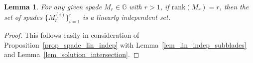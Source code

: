 \documentclass{birkjour}
\newtheorem{lem}[thm]{Lemma}
\theoremstyle{definition}
\theoremstyle{remark}
\numberwithin{equation}{section}
\newcommand{\G}{\mathbb{G}}
\newcommand{\rank}{\mbox{rank}}
\begin{document}
\begin{lem}
For any given spade $M_r\in\G$ with $r>1$, if $\rank(M_r)=r$, then
the set of spades $\{M_r^{(i)}\}_{i=1}^r$ is a linearly independent set.
\end{lem}
\begin{proof}
This follows easily in consideration of Proposition~\ref{prop_spade_lin_indep} with Lemma~\ref{lem_lin_indep_subblades} and Lemma~\ref{lem_solution_intersection}.
\end{proof}

\end{document}
